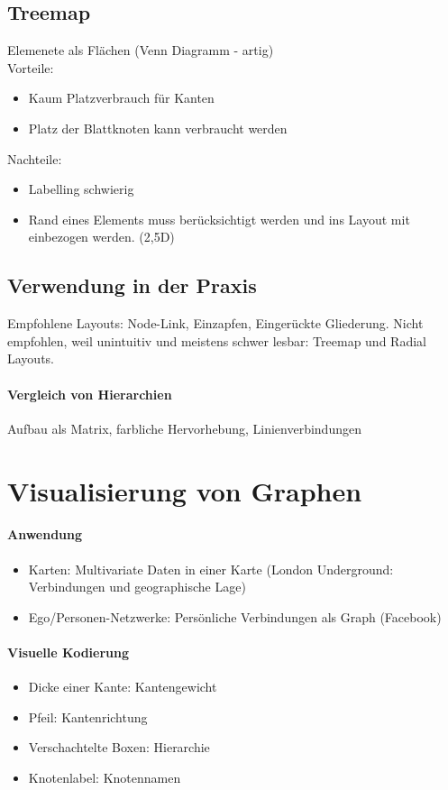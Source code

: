 \documentclass[ngerman]{scrartcl}
\begin{document}
\subsection{Treemap}
Elemenete als Flächen (Venn Diagramm - artig) \\
Vorteile: 
\begin{itemize}
  \item Kaum Platzverbrauch für Kanten
  \item Platz der Blattknoten kann verbraucht werden
\end{itemize}
Nachteile:
\begin{itemize}
  \item Labelling schwierig
  \item Rand eines Elements muss berücksichtigt werden und ins Layout mit einbezogen werden. (2,5D)
\end{itemize}



\subsection{Verwendung in der Praxis}
Empfohlene Layouts: Node-Link, Einzapfen, Eingerückte Gliederung. Nicht empfohlen, weil unintuitiv und meistens schwer lesbar: Treemap und Radial Layouts.
 
\paragraph{Vergleich von Hierarchien} Aufbau als Matrix, farbliche Hervorhebung, Linienverbindungen


\section{Visualisierung von Graphen}

\paragraph{Anwendung}
\begin{itemize}
  \item Karten: Multivariate Daten in einer Karte (London Underground: Verbindungen und geographische Lage)
  \item Ego/Personen-Netzwerke: Persönliche Verbindungen als Graph (Facebook)
\end{itemize}

\paragraph{Visuelle Kodierung}
\begin{itemize}
  \item Dicke einer Kante: Kantengewicht
  \item Pfeil: Kantenrichtung
  \item Verschachtelte Boxen: Hierarchie
  \item Knotenlabel: Knotennamen
\end{itemize}
\end{document}
